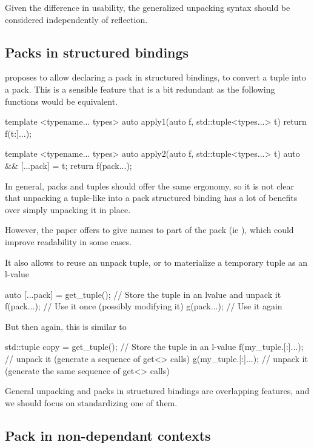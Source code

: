 \documentclass{wg21}
\begin{document}
Given the difference in usability, the generalized unpacking syntax should be considered independently of reflection.

\subsection{Packs in structured bindings}
\label{sec:packsinbindings}

 proposes to allow declaring a pack in structured bindings, to convert a tuple into a pack.
This is a sensible feature that is a bit redundant as the following functions would be equivalent.

\begin{colorblock}
template <typename... types>
auto apply1(auto f, std::tuple<types...> t) {
    return f(t:]...);
}

template <typename... types>
auto apply2(auto f, std::tuple<types...> t) {
    auto && [...pack] = t;
    return f(pack...);
}
\end{colorblock}

In general, packs and tuples should offer the same ergonomy, so it is not clear that unpacking a tuple-like into
a pack structured binding has a lot of benefits over simply unpacking it in place.

However, the paper offers to give names to part of the pack (ie ),
which could improve readability in some cases.

It also allows to reuse an unpack tuple, or to materialize a temporary tuple as an l-value

\begin{colorblock}
auto [...pack] = get_tuple();  // Store the tuple in an lvalue and unpack it
f(pack...);          // Use it once (possibly modifying it)
g(pack...);          // Use it again
\end{colorblock}

But then again, this is similar to

\begin{colorblock}
std::tuple copy = get_tuple();  // Store the tuple in an l-value
f(my_tuple.[:]...); // unpack it (generate a sequence of get<> calls)
g(my_tuple.[:]...); // unpack it (generate the same sequence of get<> calls)
\end{colorblock}


General unpacking and packs in structured bindings are overlapping features, and we should focus on standardizing one of them.

\subsection{Pack in non-dependant contexts}
\label{sec:packsoutsideoftemplate}
\end{document}
